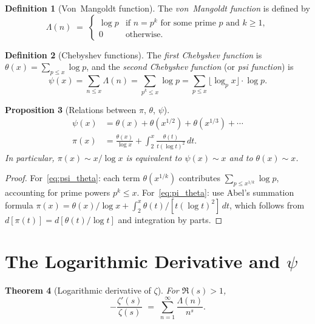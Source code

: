 \documentclass[12pt,a4paper]{amsart}
\newtheorem{theorem}{Theorem}[section]
\newtheorem{proposition}[theorem]{Proposition}
\theoremstyle{definition}
\newtheorem{definition}[theorem]{Definition}
\begin{document}
\begin{definition}[Von~Mangoldt function]
\label{def:mangoldt}
The \emph{von~Mangoldt function} is defined by
\[
  \Lambda(n) \;=\;
  \begin{cases}
    \log p & \text{if } n = p^k \text{ for some prime } p \text{ and } k \ge 1, \\
    0      & \text{otherwise.}
  \end{cases}
\]
\end{definition}

\begin{definition}[Chebyshev functions]
\label{def:chebyshev}
The \emph{first Chebyshev function} is
$\theta(x) = \sum_{p \le x} \log p$,
and the \emph{second Chebyshev function} (or \emph{psi function}) is
\[
  \psi(x) = \sum_{n \le x} \Lambda(n) = \sum_{p^k \le x} \log p
           = \sum_{p \le x} \lfloor\log_p x\rfloor \cdot \log p.
\]
\end{definition}

\begin{proposition}[Relations between $\pi$, $\theta$, $\psi$]
\label{prop:psi_theta_pi}
\begin{align}
  \psi(x) &= \theta(x) + \theta(x^{1/2}) + \theta(x^{1/3}) + \cdots
  \label{eq:psi_theta} \\
  \pi(x) &= \frac{\theta(x)}{\log x} + \int_2^x \frac{\theta(t)}{t(\log t)^2}\,dt.
  \label{eq:pi_theta}
\end{align}
In particular, $\pi(x) \sim x/\log x$ is equivalent to $\psi(x) \sim x$
and to $\theta(x) \sim x$.
\end{proposition}

\begin{proof}
For~\eqref{eq:psi_theta}: each term $\theta(x^{1/k})$ contributes
$\sum_{p \le x^{1/k}} \log p$, accounting for prime powers $p^k \le x$.
For~\eqref{eq:pi_theta}: use Abel's summation formula
$\pi(x) = \theta(x)/\log x + \int_2^x \theta(t)/[t(\log t)^2]\,dt$,
which follows from $d[\pi(t)] = d[\theta(t)/\log t]$ and integration by parts.
\end{proof}

\section{The Logarithmic Derivative and \texorpdfstring{$\psi$}{psi}}

\begin{theorem}[Logarithmic derivative of $\zeta$]
\label{thm:log_deriv}
For $\Re(s) > 1$,
\[
  -\frac{\zeta'(s)}{\zeta(s)} \;=\; \sum_{n=1}^{\infty} \frac{\Lambda(n)}{n^s}.
\]
\end{theorem}
\end{document}
